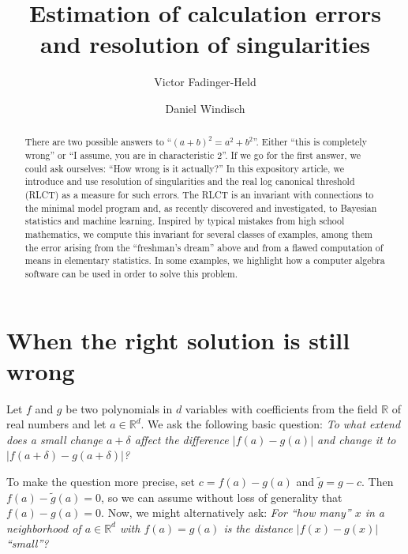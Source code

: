 \documentclass[11pt]{amsart}
\title[Calculation errors and singularities]{Estimation of calculation errors \\ and resolution of singularities}
\author[V. Fadinger-Held]{Victor Fadinger-Held}
\author[D. Windisch]{Daniel Windisch}
\numberwithin{equation}{section}
\theoremstyle{plain}
\theoremstyle{definition}
\newcommand{\R}{\mathbb{R}}
\begin{document}
\begin{abstract}
There are two possible answers to ``$(a+b)^2 = a^2 + b^2$''. Either ``this is completely wrong'' or ``I assume, you are in characteristic $2$''. If we go for the first answer, we could ask ourselves: ``How wrong is it actually?'' 
In this expository article, 
we introduce and use resolution of singularities and the real log canonical threshold (RLCT) as a measure for such errors. The RLCT is an invariant with connections to the minimal model program and, as recently discovered and investigated, to Bayesian statistics and machine learning. Inspired by typical mistakes from high school mathematics, we compute this invariant for several classes of examples, among them the error arising from the ``freshman's dream'' above and from a flawed computation of means in elementary statistics. In some examples, we highlight how a computer algebra software can be used in order to solve this problem.
\end{abstract}



\maketitle

\section{When the right solution is still wrong}\label{sec:school}

Let $f$ and $g$ be two polynomials in $d$ variables with coefficients from the field $\R$ of real numbers and let $a \in \R^d$. We ask the following basic question: \emph{To what extend does a small change $a + \delta$ affect the difference $\vert f(a) - g(a) \vert$ and change it to $\vert f(a+\delta) - g(a+\delta) \vert$?}

To make the question more precise, set $c = f(a) - g(a)$ and $\tilde{g} = g - c$. Then $f(a) - \tilde{g}(a) = 0$, so we can assume without loss of generality that $f(a) - g(a) = 0$. Now, we might alternatively ask: \emph{For ``how many'' $x$ in a neighborhood of $a \in \R^d$ with $f(a) = g(a)$ is the distance $\vert f(x) - g(x) \vert$ ``small''?} 
\end{document}
